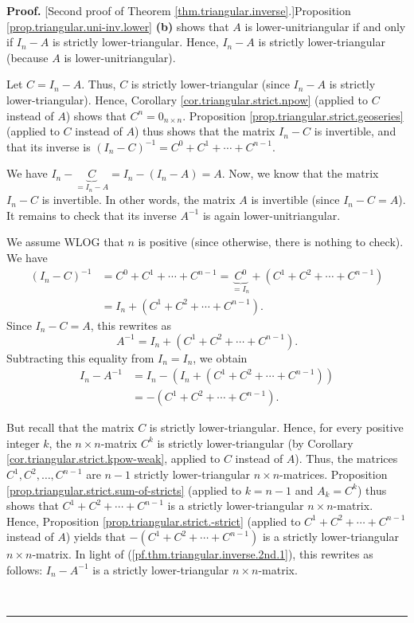 \documentclass[numbers=enddot,12pt,final,onecolumn,notitlepage]{scrartcl}%
\theoremstyle{definition}
\newenvironment{proof}[1][Proof]{\noindent\textbf{#1.} }{\ \rule{0.5em}{0.5em}}
\begin{document}
\begin{proof}
[Second proof of Theorem \ref{thm.triangular.inverse}.]Proposition
\ref{prop.triangular.uni-inv.lower} \textbf{(b)} shows that $A$ is
lower-unitriangular if and only if $I_{n}-A$ is strictly lower-triangular.
Hence, $I_{n}-A$ is strictly lower-triangular (because $A$ is lower-unitriangular).

Let $C=I_{n}-A$. Thus, $C$ is strictly lower-triangular (since $I_{n}-A$ is
strictly lower-triangular). Hence, Corollary \ref{cor.triangular.strict.npow}
(applied to $C$ instead of $A$) shows that $C^{n}=0_{n\times n}$. Proposition
\ref{prop.triangular.strict.geoseries} (applied to $C$ instead of $A$) thus
shows that the matrix $I_{n}-C$ is invertible, and that its inverse is
$\left(  I_{n}-C\right)  ^{-1}=C^{0}+C^{1}+\cdots+C^{n-1}$.

We have $I_{n}-\underbrace{C}_{=I_{n}-A}=I_{n}-\left(  I_{n}-A\right)  =A$.
Now, we know that the matrix $I_{n}-C$ is invertible. In other words, the
matrix $A$ is invertible (since $I_{n}-C=A$). It remains to check that its
inverse $A^{-1}$ is again lower-unitriangular.

We assume WLOG that $n$ is positive (since otherwise, there is nothing to
check). We have%
\begin{align*}
\left(  I_{n}-C\right)  ^{-1}  &  =C^{0}+C^{1}+\cdots+C^{n-1}%
=\underbrace{C^{0}}_{=I_{n}}+\left(  C^{1}+C^{2}+\cdots+C^{n-1}\right) \\
&  =I_{n}+\left(  C^{1}+C^{2}+\cdots+C^{n-1}\right)  .
\end{align*}
Since $I_{n}-C=A$, this rewrites as%
\[
A^{-1}=I_{n}+\left(  C^{1}+C^{2}+\cdots+C^{n-1}\right)  .
\]
Subtracting this equality from $I_{n}=I_{n}$, we obtain%
\begin{align}
I_{n}-A^{-1}  &  =I_{n}-\left(  I_{n}+\left(  C^{1}+C^{2}+\cdots
+C^{n-1}\right)  \right) \nonumber\\
&  =-\left(  C^{1}+C^{2}+\cdots+C^{n-1}\right)  .
\label{pf.thm.triangular.inverse.2nd.1}%
\end{align}


But recall that the matrix $C$ is strictly lower-triangular. Hence, for every
positive integer $k$, the $n\times n$-matrix $C^{k}$ is strictly
lower-triangular (by Corollary \ref{cor.triangular.strict.kpow-weak}, applied
to $C$ instead of $A$). Thus, the matrices $C^{1},C^{2},\ldots,C^{n-1}$ are
$n-1$ strictly lower-triangular $n\times n$-matrices. Proposition
\ref{prop.triangular.strict.sum-of-stricts} (applied to $k=n-1$ and
$A_{k}=C^{k}$) thus shows that $C^{1}+C^{2}+\cdots+C^{n-1}$ is a strictly
lower-triangular $n\times n$-matrix. Hence, Proposition
\ref{prop.triangular.strict.-strict} (applied to $C^{1}+C^{2}+\cdots+C^{n-1}$
instead of $A$) yields that $-\left(  C^{1}+C^{2}+\cdots+C^{n-1}\right)  $ is
a strictly lower-triangular $n\times n$-matrix. In light of
(\ref{pf.thm.triangular.inverse.2nd.1}), this rewrites as follows:
$I_{n}-A^{-1}$ is a strictly lower-triangular $n\times n$-matrix.


\end{proof}
\end{document}
